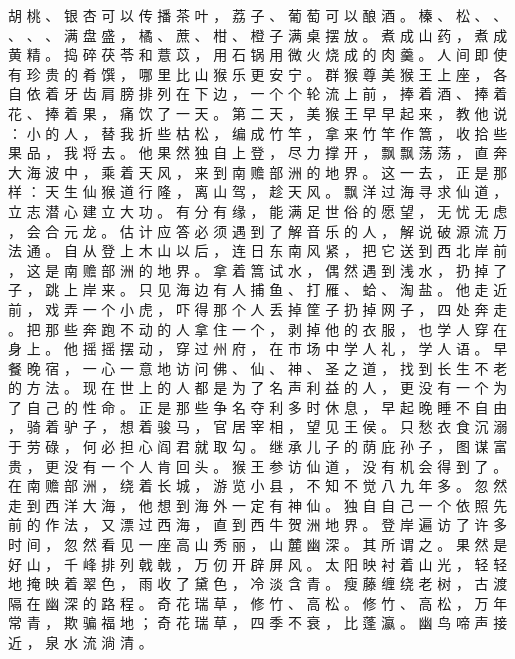 {胡 桃 、 银 杏 可 以 传 播 茶 叶 ， 荔 子 、 葡 萄 可 以 酿 酒 。
榛 、 松 、 、 、 、 、 满 盘 盛 ， 橘 、 蔗 、 柑 、 橙 子 满 桌 摆 放 。
煮 成 山 药 ， 煮 成 黄 精 。
捣 碎 茯 苓 和 薏 苡 ， 用 石 锅 用 微 火 烧 成 的 肉 羹 。
人 间 即 使 有 珍 贵 的 肴 馔 ， 哪 里 比 山 猴 乐 更 安 宁 。
群 猴 尊 美 猴 王 上 座 ， 各 自 依 着 牙 齿 肩 膀 排 列 在 下 边 ， 一 个 个 轮 流 上 前 ， 捧 着 酒 、 捧 着 花 、 捧 着 果 ， 痛 饮 了 一 天 。
第 二 天 ， 美 猴 王 早 早 起 来 ， 教 他 说 ： 小 的 人 ， 替 我 折 些 枯 松 ， 编 成 竹 竿 ， 拿 来 竹 竿 作 篙 ， 收 拾 些 果 品 ， 我 将 去 。
他 果 然 独 自 上 登 ， 尽 力 撑 开 ， 飘 飘 荡 荡 ， 直 奔 大 海 波 中 ， 乘 着 天 风 ， 来 到 南 赡 部 洲 的 地 界 。
这 一 去 ， 正 是 那 样 ： 天 生 仙 猴 道 行 隆 ， 离 山 驾 ， 趁 天 风 。
飘 洋 过 海 寻 求 仙 道 ， 立 志 潜 心 建 立 大 功 。
有 分 有 缘 ， 能 满 足 世 俗 的 愿 望 ， 无 忧 无 虑 ， 会 合 元 龙 。
估 计 应 答 必 须 遇 到 了 解 音 乐 的 人 ， 解 说 破 源 流 万 法 通 。
自 从 登 上 木 山 以 后 ， 连 日 东 南 风 紧 ， 把 它 送 到 西 北 岸 前 ， 这 是 南 赡 部 洲 的 地 界 。
拿 着 篙 试 水 ， 偶 然 遇 到 浅 水 ， 扔 掉 了 子 ， 跳 上 岸 来 。
只 见 海 边 有 人 捕 鱼 、 打 雁 、 蛤 、 淘 盐 。
他 走 近 前 ， 戏 弄 一 个 小 虎 ， 吓 得 那 个 人 丢 掉 筐 子 扔 掉 网 子 ， 四 处 奔 走 。
把 那 些 奔 跑 不 动 的 人 拿 住 一 个 ， 剥 掉 他 的 衣 服 ， 也 学 人 穿 在 身 上 。
他 摇 摇 摆 动 ， 穿 过 州 府 ， 在 市 场 中 学 人 礼 ， 学 人 语 。
早 餐 晚 宿 ， 一 心 一 意 地 访 问 佛 、 仙 、 神 、 圣 之 道 ， 找 到 长 生 不 老 的 方 法 。
现 在 世 上 的 人 都 是 为 了 名 声 利 益 的 人 ， 更 没 有 一 个 为 了 自 己 的 性 命 。
正 是 那 些 争 名 夺 利 多 时 休 息 ， 早 起 晚 睡 不 自 由 ， 骑 着 驴 子 ， 想 着 骏 马 ， 官 居 宰 相 ， 望 见 王 侯 。
只 愁 衣 食 沉 溺 于 劳 碌 ， 何 必 担 心 阎 君 就 取 勾 。
继 承 儿 子 的 荫 庇 孙 子 ， 图 谋 富 贵 ， 更 没 有 一 个 人 肯 回 头 。
猴 王 参 访 仙 道 ， 没 有 机 会 得 到 了 。
在 南 赡 部 洲 ， 绕 着 长 城 ， 游 览 小 县 ， 不 知 不 觉 八 九 年 多 。
忽 然 走 到 西 洋 大 海 ， 他 想 到 海 外 一 定 有 神 仙 。
独 自 自 己 一 个 依 照 先 前 的 作 法 ， 又 漂 过 西 海 ， 直 到 西 牛 贺 洲 地 界 。
登 岸 遍 访 了 许 多 时 间 ， 忽 然 看 见 一 座 高 山 秀 丽 ， 山 麓 幽 深 。
其 所 谓 之 。
果 然 是 好 山 ， 千 峰 排 列 戟 戟 ， 万 仞 开 辟 屏 风 。
太 阳 映 衬 着 山 光 ， 轻 轻 地 掩 映 着 翠 色 ， 雨 收 了 黛 色 ， 冷 淡 含 青 。
瘦 藤 缠 绕 老 树 ， 古 渡 隔 在 幽 深 的 路 程 。
奇 花 瑞 草 ， 修 竹 、 高 松 。
修 竹 、 高 松 ， 万 年 常 青 ， 欺 骗 福 地 ； 奇 花 瑞 草 ， 四 季 不 衰 ， 比 蓬 瀛 。
幽 鸟 啼 声 接 近 ， 泉 水 流 淌 清 。
}
